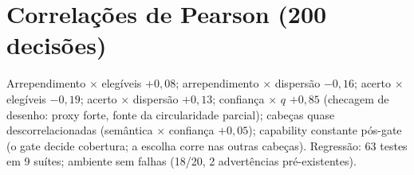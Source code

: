 \section{Correlações de Pearson (200 decisões)}
Arrependimento $\times$ elegíveis $+0{,}08$; arrependimento $\times$ dispersão $-0{,}16$; acerto $\times$ elegíveis $-0{,}19$; acerto $\times$ dispersão $+0{,}13$; confiança $\times$ $q$ $+0{,}85$ (checagem de desenho: proxy forte, fonte da circularidade parcial); cabeças quase descorrelacionadas (semântica $\times$ confiança $+0{,}05$); capability constante pós-gate (o gate decide cobertura; a escolha corre nas outras cabeças). Regressão: 63 testes em 9 suítes; ambiente sem falhas (18/20, 2 advertências pré-existentes).
